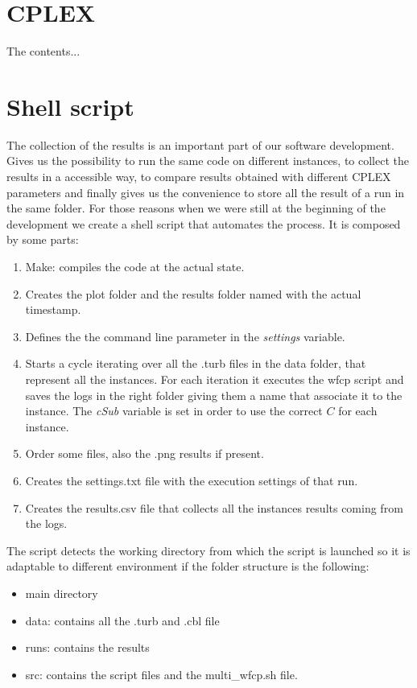 
\begin{appendices}
\chapter{CPLEX}
The contents...

\chapter{Shell script}
The collection of the results is an important part of our software development. Gives us the possibility to run the same code on different instances, to collect the results in a accessible way, to compare results obtained with different CPLEX parameters and finally gives us the convenience to store all the result of a run in the same folder. 
For those reasons when we were still at the beginning of the development we create a shell script that automates the process. It is composed by some parts:
\begin{enumerate}
\item Make: compiles the code at the actual state.
\item Creates the plot folder and the results folder named with the actual timestamp.
\item Defines the the command line parameter in the \textit{settings} variable.
\item Starts a cycle iterating over all the .turb files in the data folder, that represent all the instances. For each iteration it executes the wfcp script and saves the logs in the right folder giving them a name that associate it to the instance. The \textit{cSub} variable is set in order to use the correct $C$ for each instance.
\item Order some files, also the .png results if present.
\item Creates the settings.txt file with the execution settings of that run.
\item Creates the results.csv file that collects all the instances results coming from the logs.
\end{enumerate}

The script detects the working directory from which the script is launched so it is adaptable to different environment if the folder structure is the following:
\begin{itemize}
\item main directory
\item data: contains all the .turb and .cbl file
\item runs: contains the results 
\item src: contains the script files and the multi\_wfcp.sh file. 
\end{itemize}


\end{appendices}
